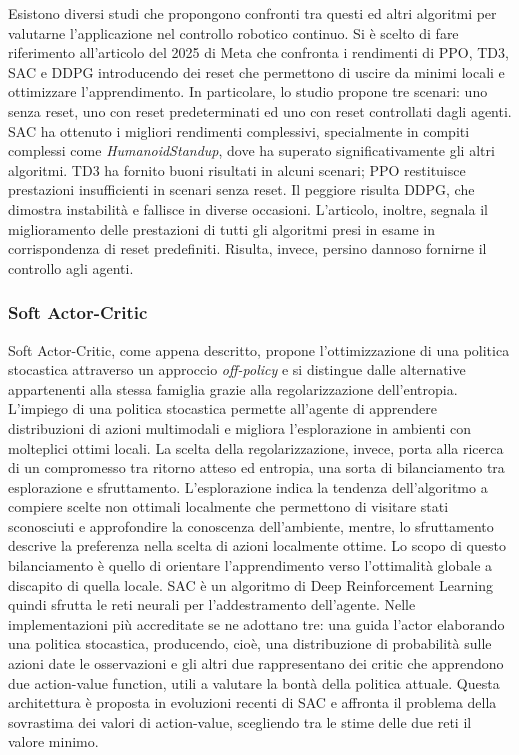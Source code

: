Esistono diversi studi che propongono confronti tra questi ed altri algoritmi per valutarne l'applicazione nel controllo robotico continuo. Si è scelto di fare riferimento all'articolo del 2025 di Meta \cite{wan2025empirical} che confronta i rendimenti di PPO, TD3, SAC e DDPG introducendo dei reset che permettono di uscire da minimi locali e ottimizzare l'apprendimento. In particolare, lo studio propone tre scenari: uno senza reset, uno con reset predeterminati ed uno con reset controllati dagli agenti. SAC ha ottenuto i migliori rendimenti complessivi, specialmente in compiti complessi come \textit{HumanoidStandup}, dove ha superato significativamente gli altri algoritmi. TD3 ha fornito buoni risultati in alcuni scenari; PPO restituisce prestazioni insufficienti in scenari senza reset. Il peggiore risulta DDPG, che dimostra instabilità e fallisce in diverse occasioni. L'articolo, inoltre, segnala il miglioramento delle prestazioni di tutti gli algoritmi presi in esame in corrispondenza di reset predefiniti. Risulta, invece, persino dannoso fornirne il controllo agli agenti.


\subsubsection{Soft Actor-Critic}
Soft Actor-Critic, come appena descritto, propone l'ottimizzazione di una politica stocastica attraverso un approccio \textit{off-policy} e si distingue dalle alternative appartenenti alla stessa famiglia grazie alla regolarizzazione dell'entropia. L'impiego di una politica stocastica permette all'agente di apprendere distribuzioni di azioni multimodali e migliora l'esplorazione in ambienti con molteplici ottimi locali. La scelta della regolarizzazione, invece, porta alla ricerca di un compromesso tra ritorno atteso ed entropia, una sorta di bilanciamento tra esplorazione e sfruttamento. L'esplorazione indica la tendenza dell'algoritmo a compiere scelte non ottimali localmente che permettono di visitare stati sconosciuti e approfondire la conoscenza dell'ambiente, mentre, lo sfruttamento descrive la preferenza nella scelta di azioni localmente ottime. Lo scopo di questo bilanciamento è quello di orientare l'apprendimento verso l'ottimalità globale a discapito di quella locale. SAC è un algoritmo di Deep Reinforcement Learning quindi sfrutta le reti neurali per l'addestramento dell'agente. Nelle implementazioni più accreditate se ne adottano tre: una guida l'actor elaborando una politica stocastica, producendo, cioè, una distribuzione di probabilità sulle azioni date le osservazioni e gli altri due rappresentano dei critic che apprendono due action-value function, utili a valutare la bontà della politica attuale. Questa architettura è proposta in evoluzioni recenti di SAC e affronta il problema della sovrastima dei valori di action-value, scegliendo tra le stime delle due reti il valore minimo.



